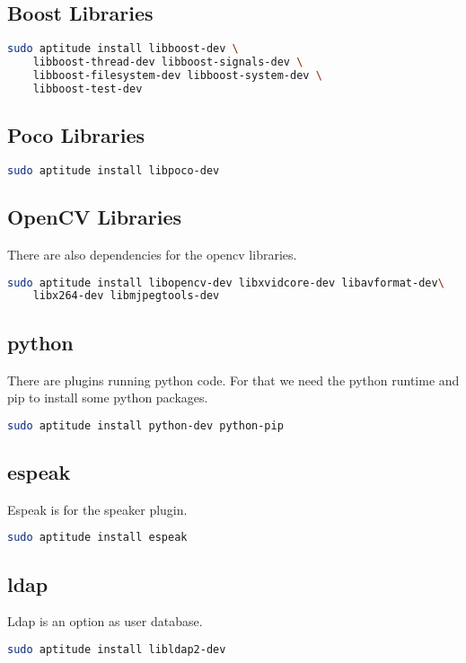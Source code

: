 \documentclass[a4paper,11pt]{report}
\begin{document}
\subsection{Boost Libraries}
\begin{lstlisting}[language=bash,caption={install boost}]
sudo aptitude install libboost-dev \
	libboost-thread-dev libboost-signals-dev \
	libboost-filesystem-dev libboost-system-dev \
	libboost-test-dev
\end{lstlisting}

\subsection{Poco Libraries}
\begin{lstlisting}[language=bash,caption={install poco}]
sudo aptitude install libpoco-dev
\end{lstlisting}

\subsection{OpenCV Libraries}
There are also dependencies for the opencv libraries.
\begin{lstlisting}[language=bash,caption={install opencv}]
sudo aptitude install libopencv-dev libxvidcore-dev libavformat-dev\
	libx264-dev libmjpegtools-dev
\end{lstlisting}

\subsection{python}
There are plugins running python code.
For that we need the python runtime and pip to install some python packages.
\begin{lstlisting}[language=bash,caption={install python, python-pip}]
sudo aptitude install python-dev python-pip
\end{lstlisting}

\subsection{espeak}
Espeak is for the speaker plugin.
\begin{lstlisting}[language=bash,caption={install libespeak}]
sudo aptitude install espeak
\end{lstlisting}

\subsection{ldap}
Ldap is an option as user database.
\begin{lstlisting}[language=bash,caption={install libldap}]
sudo aptitude install libldap2-dev
\end{lstlisting}
\end{document}
